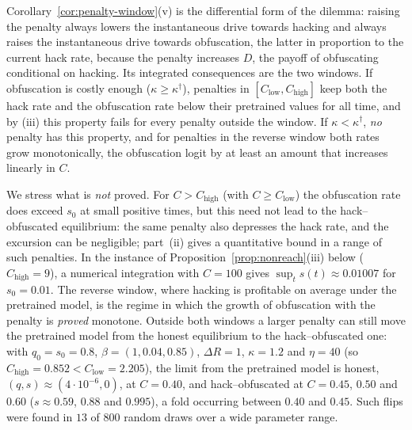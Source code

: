 \begin{remark}
\label{rem:dilemma}
Corollary~\ref{cor:penalty-window}(v) is the differential form of the
dilemma: raising the penalty always lowers the instantaneous drive towards
hacking and always raises the instantaneous drive towards obfuscation, the
latter in proportion to the current hack rate, because the penalty
increases $D$, the payoff of obfuscating conditional on hacking. Its
integrated consequences are the two windows. If obfuscation is costly
enough ($\kappa\ge\kappa^\dagger$), penalties in
$[C_{\mathrm{low}},C_{\mathrm{high}}]$ keep both the hack rate and the
obfuscation rate below their pretrained values for all time, and by
(iii) this property fails for every penalty outside the window. If
$\kappa<\kappa^\dagger$, \emph{no} penalty has this property, and for
penalties in the reverse window both rates grow monotonically, the
obfuscation logit by at least an amount that increases linearly in $C$.

We stress what is \emph{not} proved. For $C>C_{\mathrm{high}}$ (with
$C\ge C_{\mathrm{low}}$) the obfuscation rate does exceed $s_0$ at small
positive times, but this need not lead to the hack--obfuscated equilibrium:
the same penalty also depresses the hack rate, and the excursion can be
negligible; part~(ii) gives a quantitative bound in a range of such
penalties. In the instance of Proposition~\ref{prop:nonreach}(iii) below
($C_{\mathrm{high}}=9$), a numerical integration with $C=100$ gives
$\sup_ts(t)\approx0.01007$ for $s_0=0.01$. The reverse window, where hacking is profitable on average under the pretrained model, is the regime in which the growth of obfuscation with the penalty is \emph{proved} monotone. Outside both windows a larger penalty can still move the pretrained model from the honest equilibrium to the hack--obfuscated one: with $q_0=s_0=0.8$, $\beta=(1,0.04,0.85)$, $\Delta R=1$, $\kappa=1.2$ and $\eta=40$ (so $C_{\mathrm{high}}=0.852<C_{\mathrm{low}}=2.205$), the limit from the pretrained model is honest, $(q,s)\approx(4\cdot10^{-6},0)$, at $C=0.40$, and hack--obfuscated at $C=0.45$, $0.50$ and $0.60$ ($s\approx0.59$, $0.88$ and $0.995$), a fold occurring between $0.40$ and $0.45$. Such flips were found in $13$ of $800$ random draws over a wide parameter range.
\end{remark}

